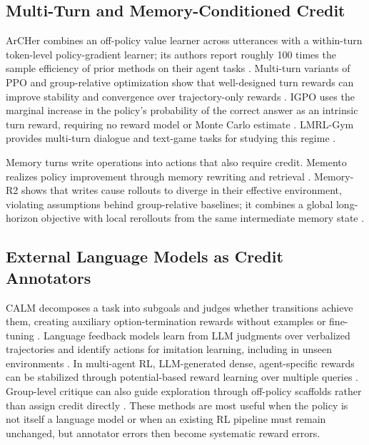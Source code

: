 \subsection{Multi-Turn and Memory-Conditioned Credit}

ArCHer combines an off-policy value learner across utterances with a within-turn token-level policy-gradient learner; its authors report roughly 100 times the sample efficiency of prior methods on their agent tasks \citep{zhou2024archer}. Multi-turn variants of PPO and group-relative optimization show that well-designed turn rewards can improve stability and convergence over trajectory-only rewards \citep{wei2025reinforcing}. IGPO uses the marginal increase in the policy's probability of the correct answer as an intrinsic turn reward, requiring no reward model or Monte Carlo estimate \citep{wang2025information}. LMRL-Gym provides multi-turn dialogue and text-game tasks for studying this regime \citep{abdulhai2023lmrl}.

Memory turns write operations into actions that also require credit. Memento realizes policy improvement through memory rewriting and retrieval \citep{zhou2025memento}. Memory-R2 shows that writes cause rollouts to diverge in their effective environment, violating assumptions behind group-relative baselines; it combines a global long-horizon objective with local rerollouts from the same intermediate memory state \citep{yan2026memoryr2}.

\subsection{External Language Models as Credit Annotators}

CALM decomposes a task into subgoals and judges whether transitions achieve them, creating auxiliary option-termination rewards without examples or fine-tuning \citep{pignatelli2024assessing}. Language feedback models learn from LLM judgments over verbalized trajectories and identify actions for imitation learning, including in unseen environments \citep{zhong2024policy}. In multi-agent RL, LLM-generated dense, agent-specific rewards can be stabilized through potential-based reward learning over multiple queries \citep{lin2025speaking}. Group-level critique can also guide exploration through off-policy scaffolds rather than assign credit directly \citep{huang2026bootstrapping}. These methods are most useful when the policy is not itself a language model or when an existing RL pipeline must remain unchanged, but annotator errors then become systematic reward errors.
